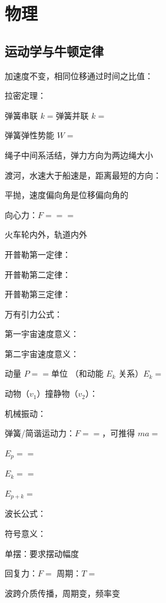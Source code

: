 \section{物理}

\subsection{运动学与牛顿定律}

加速度不变，相同位移通过时间之比值：

拉密定理：

弹簧串联 $k=$\sbl \quad 弹簧并联 $k=$\sbl

弹簧弹性势能 $W=$\mbl

绳子中间系活结，弹力方向为\sbl 两边绳大小\sbl

渡河，水速大于船速是，距离最短的方向：

平抛，速度偏向角是位移偏向角的\sbl

向心力：$F=$\sbl $=$\sbl $=$\sbl

火车轮内\sbl 外\sbl ，轨道内\sbl 外\sbl

开普勒第一定律：

开普勒第二定律：

开普勒第三定律：

万有引力公式：

第一宇宙速度意义：

第二宇宙速度意义：

动量 $P=$\sbl $=$\sbl 单位 \cmb（和动能 $E_k$ 关系）$E_k=$\sbl

动物（$v_1$）撞静物（$v_2$）：

机械振动：

弹簧/简谐运动力：$F=$\sbl $=$\sbl ，可推得 $ma=$\sbl \esb


$E_p=$\xlbl $=$\xlbl

$E_k=$\xlbl $=$\xlbl

$E_{p+k}=$\xlbl

波长公式：\xlbl \hspace{2em} 

符号意义：


单摆：要求摆动幅度\mbl

回复力：$F=$\lbl \hspace{2em} 周期：$T=$\lbl

波跨介质传播，周期\sbl 变，频率\sbl 变

